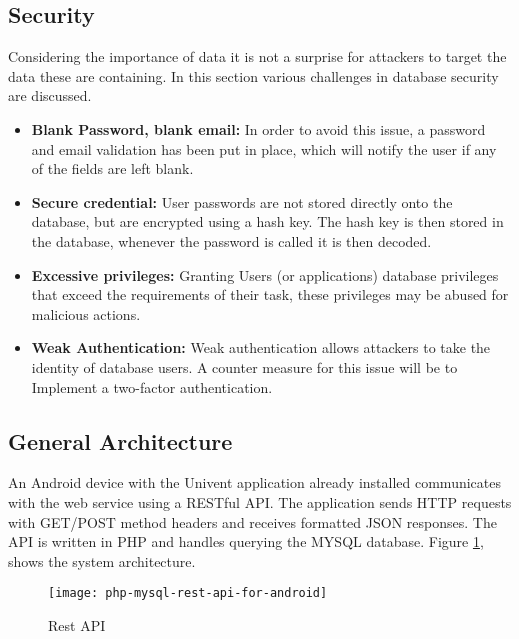 \subsection{Security}
 Considering the importance of data it is not a surprise for attackers to target the data these are containing. In this section various challenges in database security are discussed.
\begin{itemize}	
\item 	\textbf{Blank Password, blank email:} In order to avoid this issue, a password and email validation has been put in place, which will notify the user if any of the fields are left blank.

\item 	\textbf{Secure credential:} User passwords are not stored directly onto the database, but are encrypted using a  hash key. The hash key is then stored in the database, whenever the password is called it is then decoded.
	
\item 	\textbf{Excessive privileges:} Granting  Users (or applications) database privileges that exceed the requirements of their task, these privileges may be abused for malicious actions. 
	
\item 	\textbf{Weak Authentication:} Weak authentication allows attackers to take the identity of database users. A counter measure for this issue will be to Implement a two-factor authentication.
\end{itemize}

\subsection{General Architecture }
An Android device with the Univent application already installed communicates with the web service using a RESTful API.
The application sends HTTP requests with GET/POST method headers and receives formatted JSON responses. The API is written in PHP and handles querying the MYSQL database. Figure \ref{fig:API_design}, shows the system architecture.
\begin{figure}[h!]
	\centering       
	\texttt{[image: php-mysql-rest-api-for-android]}
	\caption{Rest API}
	\label{fig:API_design}	
\end{figure}
\FloatBarrier




